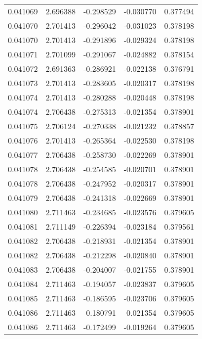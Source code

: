 \begin{tabular}{lrrrr}
0.041069    &  2.696388 & -0.298529 & -0.030770 &             0.377494 \\
0.041070    &  2.701413 & -0.296042 & -0.031023 &             0.378198 \\
0.041070    &  2.701413 & -0.291896 & -0.029324 &             0.378198 \\
0.041071    &  2.701099 & -0.291067 & -0.024882 &             0.378154 \\
0.041072    &  2.691363 & -0.286921 & -0.022138 &             0.376791 \\
0.041073    &  2.701413 & -0.283605 & -0.020317 &             0.378198 \\
0.041074    &  2.701413 & -0.280288 & -0.020448 &             0.378198 \\
0.041074    &  2.706438 & -0.275313 & -0.021354 &             0.378901 \\
0.041075    &  2.706124 & -0.270338 & -0.021232 &             0.378857 \\
0.041076    &  2.701413 & -0.265364 & -0.022530 &             0.378198 \\
0.041077    &  2.706438 & -0.258730 & -0.022269 &             0.378901 \\
0.041078    &  2.706438 & -0.254585 & -0.020701 &             0.378901 \\
0.041078    &  2.706438 & -0.247952 & -0.020317 &             0.378901 \\
0.041079    &  2.706438 & -0.241318 & -0.022669 &             0.378901 \\
0.041080    &  2.711463 & -0.234685 & -0.023576 &             0.379605 \\
0.041081    &  2.711149 & -0.226394 & -0.023184 &             0.379561 \\
0.041082    &  2.706438 & -0.218931 & -0.021354 &             0.378901 \\
0.041082    &  2.706438 & -0.212298 & -0.020840 &             0.378901 \\
0.041083    &  2.706438 & -0.204007 & -0.021755 &             0.378901 \\
0.041084    &  2.711463 & -0.194057 & -0.023837 &             0.379605 \\
0.041085    &  2.711463 & -0.186595 & -0.023706 &             0.379605 \\
0.041086    &  2.711463 & -0.180791 & -0.021354 &             0.379605 \\
0.041086    &  2.711463 & -0.172499 & -0.019264 &             0.379605 \\

\end{tabular}
